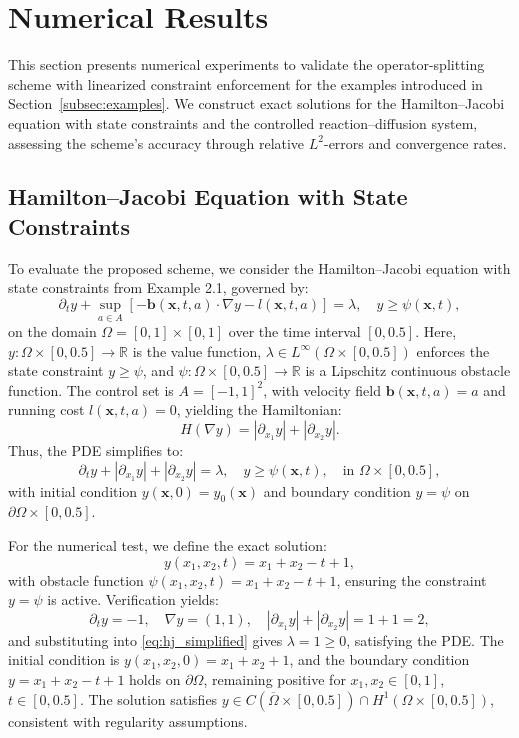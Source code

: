 \documentclass[pdflatex,sn-mathphys-num]{sn-jnl}%
\theoremstyle{thmstyleone}%
\numberwithin{equation}{section}
\begin{document}
\section{Numerical Results}\label{sec:numerical_results}
This section presents numerical experiments to validate the operator-splitting scheme with linearized constraint enforcement for the examples introduced in Section~\ref{subsec:examples}. We construct exact solutions for the Hamilton--Jacobi equation with state constraints and the controlled reaction--diffusion system, assessing the scheme's accuracy through relative $L^2$-errors and convergence rates.

\subsection{Hamilton--Jacobi Equation with State Constraints}
\label{subsec:numerical_test}

To evaluate the proposed scheme, we consider the Hamilton--Jacobi equation with state constraints from Example 2.1, governed by:
\begin{equation}
\label{eq:hj_pde}
\partial_t y + \sup_{a \in A} \left[ -\bm{b}(\bm{x}, t, a) \cdot \nabla y - l(\bm{x}, t, a) \right] = \lambda, \quad y \geq \psi(\bm{x}, t),
\end{equation}
on the domain $\Omega = [0,1] \times [0,1]$ over the time interval $[0, 0.5]$. Here, $y: \Omega \times [0, 0.5] \to \mathbb{R}$ is the value function, $\lambda \in L^\infty(\Omega \times [0, 0.5])$ enforces the state constraint $y \geq \psi$, and $\psi: \Omega \times [0, 0.5] \to \mathbb{R}$ is a Lipschitz continuous obstacle function. The control set is $A = [-1,1]^2$, with velocity field $\bm{b}(\bm{x}, t, a) = a$ and running cost $l(\bm{x}, t, a) = 0$, yielding the Hamiltonian:
\[
H(\nabla y) = |\partial_{x_1} y| + |\partial_{x_2} y|.
\]
Thus, the PDE simplifies to:
\begin{equation}
\label{eq:hj_simplified}
\partial_t y + |\partial_{x_1} y| + |\partial_{x_2} y| = \lambda, \quad y \geq \psi(\bm{x}, t), \quad \text{in } \Omega \times [0, 0.5],
\end{equation}
with initial condition $y(\bm{x}, 0) = y_0(\bm{x})$ and boundary condition $y = \psi$ on $\partial \Omega \times [0, 0.5]$.

For the numerical test, we define the exact solution:
\[
y(x_1, x_2, t) = x_1 + x_2 - t + 1,
\]
with obstacle function $\psi(x_1, x_2, t) = x_1 + x_2 - t + 1$, ensuring the constraint $y = \psi$ is active. Verification yields:
\[
\partial_t y = -1, \quad \nabla y = (1, 1), \quad |\partial_{x_1} y| + |\partial_{x_2} y| = 1 + 1 = 2,
\]
and substituting into \eqref{eq:hj_simplified} gives $\lambda = 1 \geq 0$, satisfying the PDE. The initial condition is $y(x_1, x_2, 0) = x_1 + x_2 + 1$, and the boundary condition $y = x_1 + x_2 - t + 1$ holds on $\partial \Omega$, remaining positive for $x_1, x_2 \in [0,1]$, $t \in [0, 0.5]$. The solution satisfies $y \in C(\overline{\Omega} \times [0, 0.5]) \cap H^1(\Omega \times [0, 0.5])$, consistent with regularity assumptions.
\end{document}
